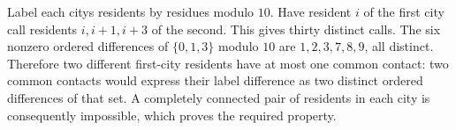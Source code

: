 Label each city\textquotesingle s residents by residues modulo $10$. Have resident $i$ of the first city call residents $i,i+1,i+3$ of the second. This gives thirty distinct calls. The six nonzero ordered differences of $\{0,1,3\}$ modulo $10$ are $1,2,3,7,8,9$, all distinct. Therefore two different first-city residents have at most one common contact: two common contacts would express their label difference as two distinct ordered differences of that set. A completely connected pair of residents in each city is consequently impossible, which proves the required property.
